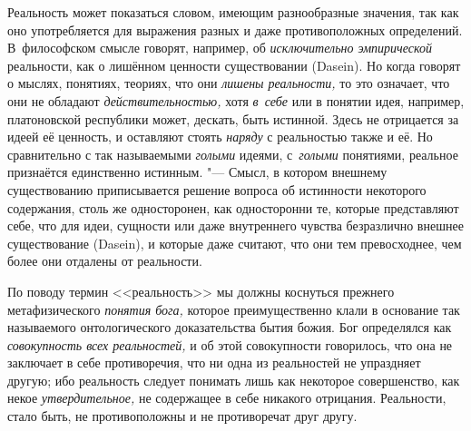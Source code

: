 
\label{bkm:bm73a}Реальность может показаться словом, имеющим разнообразные
значения, так как оно употребляется для выражения разных и даже противоположных
определений. В~философском смысле говорят, например, об {\em исключительно
эмпирической} реальности, как о лишённом ценности существовании (Dasein). Но
когда говорят о мыслях, понятиях, теориях, что они {\em лишены реальности,} то
это означает, что они не обладают {\em действительностью,} хотя {\em в~себе}
или в понятии идея, например, платоновской республики может, дескать, быть
истинной. Здесь не отрицается за идеей её ценность, и оставляют стоять
{\em наряду} с реальностью также и её. Но сравнительно с так называемыми
{\em голыми} идеями, с~{\em голыми} понятиями, реальное признаётся единственно
истинным. "--- Смысл, в котором внешнему существованию приписывается решение
вопроса об истинности некоторого содержания, столь же односторонен, как
односторонни те, которые представляют себе, что для идеи, сущности или даже
внутреннего чувства безразлично внешнее существование (Dasein), и которые даже
считают, что они тем превосходнее, чем более они отдалены от реальности.

По поводу термин <<реальность>> мы должны коснуться прежнего метафизического
{\em понятия бога,} которое преимущественно клали в основание так называемого
онтологического доказательства бытия божия. Бог определялся как
{\em совокупность всех реальностей,} и об этой совокупности говорилось, что она
не заключает в себе противоречия, что ни одна из реальностей не упраздняет
другую; ибо реальность следует понимать лишь как некоторое совершенство, как
некое {\em утвердительное,} не содержащее в себе никакого отрицания.
Реальности, стало быть, не противоположны и не противоречат друг другу.

